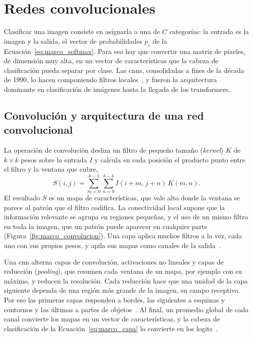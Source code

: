 \section{Redes convolucionales}
\label{sec:marco_vision}

Clasificar una imagen consiste en asignarla a una de $C$ categorías: la entrada es la imagen y la salida, el
vector de probabilidades $p_c$ de la Ecuación~\ref{eq:marco_softmax}. Para eso hay que convertir una matriz
de píxeles, de dimensión muy alta, en un vector de características que la cabeza de clasificación pueda
separar por clase. Las \glspl{cnn}, consolidadas a fines de la década de 1990, lo hacen componiendo filtros
locales~\cite{lecun1998gradient}, y fueron la arquitectura dominante en clasificación de imágenes hasta la
llegada de los transformers.

\subsection{Convolución y arquitectura de una red convolucional}
\label{sec:marco_cnn}

La operación de convolución desliza un filtro de pequeño tamaño (\emph{kernel}) $K$ de $k \times k$ pesos
sobre la entrada $I$ y calcula en cada posición el producto punto entre el filtro y la ventana que cubre,
\begin{equation}
    S(i, j) = \sum_{m=0}^{k-1}\sum_{n=0}^{k-1} I(i+m,\, j+n)\, K(m, n).
    \label{eq:marco_convolucion}
\end{equation}
El resultado $S$ es un mapa de características, que vale alto donde la ventana se parece al patrón que el
filtro codifica. La conectividad local supone que la información relevante se agrupa en regiones pequeñas, y
el uso de un mismo filtro en toda la imagen, que un patrón puede aparecer en cualquier parte
(Figura~\ref{fig:marco_convolucion}). Una capa aplica muchos filtros a la vez, cada uno con sus propios pesos,
y apila sus mapas como canales de la salida~\cite{lecun1998gradient,goodfellow2016deep}.



Una \gls{cnn} alterna capas de convolución, activaciones no lineales y capas de reducción (\emph{pooling}),
que resumen cada ventana de un mapa, por ejemplo con su máximo, y reducen la resolución. Cada reducción hace que
una unidad de la capa siguiente dependa de una región más grande de la imagen, su campo receptivo. Por eso las
primeras capas responden a bordes, las siguientes a esquinas y contornos y las últimas a partes de
objetos~\cite{goodfellow2016deep}. Al final, un promedio global de cada canal convierte los mapas en un vector
de características, y la cabeza de clasificación de la Ecuación~\ref{eq:marco_capa} lo convierte en los
logits~\cite{he2015residual}.

